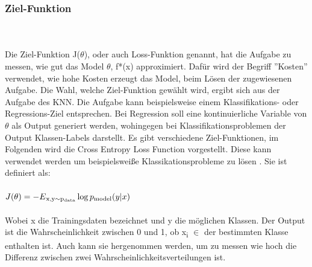 \documentclass{llncs}
\begin{document}
\newpage
\subsubsection{Ziel-Funktion}\label{sec:Zielfunktion}
~\\\\
Die Ziel-Funktion J($\theta$), oder auch Loss-Funktion genannt, hat die Aufgabe zu messen, wie gut das Model $\theta$, f*(x) approximiert. Dafür wird der Begriff ''Kosten'' verwendet, wie hohe Kosten erzeugt das Model, beim Lösen der zugewiesenen Aufgabe. Die Wahl, welche Ziel-Funktion gewählt wird, ergibt sich aus der Aufgabe des KNN. Die Aufgabe kann beispielsweise einem Klassifikations- oder Regressions-Ziel entsprechen. Bei Regression soll eine kontinuierliche Variable von $\theta$ als Output generiert werden, wohingegen bei Klassifikationsproblemen der Output Klassen-Labels darstellt. Es gibt verschiedene Ziel-Funktionen, im Folgenden wird die Cross Entropy Loss Function vorgestellt. Diese kann verwendet werden um beispielsweiße Klassikationsprobleme zu lösen \cite{Grundlagen}. Sie ist definiert als:
\\\\
\begin{math}
J(\theta) =-E\textsubscript{x,y$\sim$p\textsubscript{data}}\log p\textsubscript{model}(y|x)
\end{math}
\\\\
Wobei x die Trainingsdaten bezeichnet und y die möglichen Klassen. Der Output ist die Wahrscheinlichkeit zwischen 0 und 1, ob  x\textsubscript{i} $\in$ der bestimmten Klasse enthalten ist. Auch kann sie hergenommen werden, um zu messen wie hoch die Differenz zwischen zwei Wahrscheinlichkeitsverteilungen ist.
\end{document}
